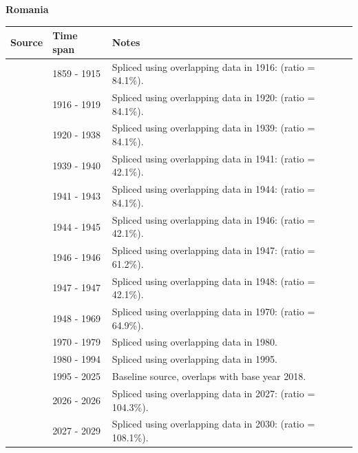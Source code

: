 \documentclass[12pt,a4paper,landscape]{article}
\begin{document}
\begin{adjustbox}{max totalsize={\paperwidth}{\paperheight},center}
\begin{minipage}[t][\textheight][t]{\textwidth}
\vspace*{0.5cm}
{}
\begin{center}
{\Large\bfseries Romania}
\end{center}
\vspace{0.5cm}
\begin{table}[H]
\centering
\small
\begin{tabular}{|l|l|l|}
\hline
\textbf{Source} & \textbf{Time span} & \textbf{Notes} \\
\hline
\rowcolor{white}\cite{Tena}& 1859 - 1915 &Spliced using overlapping data in 1916: (ratio = 84.1\%).\\
\rowcolor{lightgray}\cite{Mitchell}& 1916 - 1919 &Spliced using overlapping data in 1920: (ratio = 84.1\%).\\
\rowcolor{white}\cite{Tena}& 1920 - 1938 &Spliced using overlapping data in 1939: (ratio = 84.1\%).\\
\rowcolor{lightgray}\cite{NBS}& 1939 - 1940 &Spliced using overlapping data in 1941: (ratio = 42.1\%).\\
\rowcolor{white}\cite{Mitchell}& 1941 - 1943 &Spliced using overlapping data in 1944: (ratio = 84.1\%).\\
\rowcolor{lightgray}\cite{NBS}& 1944 - 1945 &Spliced using overlapping data in 1946: (ratio = 42.1\%).\\
\rowcolor{white}\cite{Mitchell}& 1946 - 1946 &Spliced using overlapping data in 1947: (ratio = 61.2\%).\\
\rowcolor{lightgray}\cite{NBS}& 1947 - 1947 &Spliced using overlapping data in 1948: (ratio = 42.1\%).\\
\rowcolor{white}\cite{Mitchell}& 1948 - 1969 &Spliced using overlapping data in 1970: (ratio = 64.9\%).\\
\rowcolor{lightgray}\cite{UN}& 1970 - 1979 &Spliced using overlapping data in 1980.\\
\rowcolor{white}\cite{AMECO}& 1980 - 1994 &Spliced using overlapping data in 1995.\\
\rowcolor{lightgray}\cite{OECD_EO}& 1995 - 2025 &Baseline source, overlaps with base year 2018.\\
\rowcolor{white}\cite{AMECO}& 2026 - 2026 &Spliced using overlapping data in 2027: (ratio = 104.3\%).\\
\rowcolor{lightgray}\cite{IMF_WEO_forecast}& 2027 - 2029 &Spliced using overlapping data in 2030: (ratio = 108.1\%).\\

\end{tabular}
\end{table}
\end{minipage}
\end{adjustbox}
\end{document}
